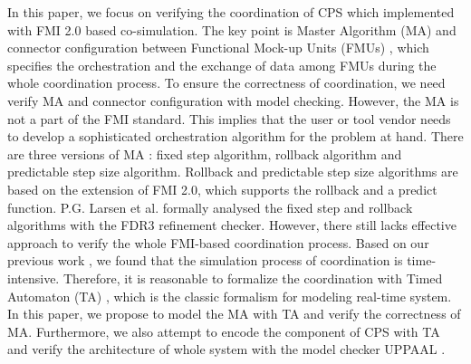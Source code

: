 In this paper, we focus on verifying the coordination of CPS which implemented with FMI 2.0 \cite{Cremona2006Automatic} based co-simulation. The key point is Master Algorithm (MA) \cite{AckerDVM15} and connector configuration between Functional Mock-up Units (FMUs) \cite{Tripakis15}, which specifies the orchestration and the exchange of data among FMUs during the whole coordination process. To ensure the correctness of coordination, we need verify MA and connector configuration with model checking. However, the MA is not a part of the FMI standard. This implies that the user or tool vendor needs to develop a sophisticated orchestration algorithm for the problem at hand. 
There are three versions of MA \cite{BromanBGLMTW13}: fixed step algorithm, rollback algorithm and predictable step size algorithm. Rollback and predictable step size algorithms are based on the extension of FMI 2.0, which supports the rollback and a predict function. P.G. Larsen et al. \cite{Larsen2016Integrated} formally analysed the fixed step and rollback algorithms with the FDR3 refinement checker. However, there still lacks effective approach to verify the whole FMI-based coordination process. Based on our previous work \cite{LiuJWCD16}, we found that the simulation process of coordination is time-intensive. Therefore, it is reasonable to formalize the coordination with Timed Automaton (TA) \cite{BehrmannDLHPYH06}, which is the classic formalism for modeling real-time system. 
In this paper, we propose to model the MA with TA and verify the correctness of MA. Furthermore, we also attempt to encode the component of CPS with TA and verify the architecture of whole system with the model checker UPPAAL \cite{BehrmannDLHPYH06}. 

